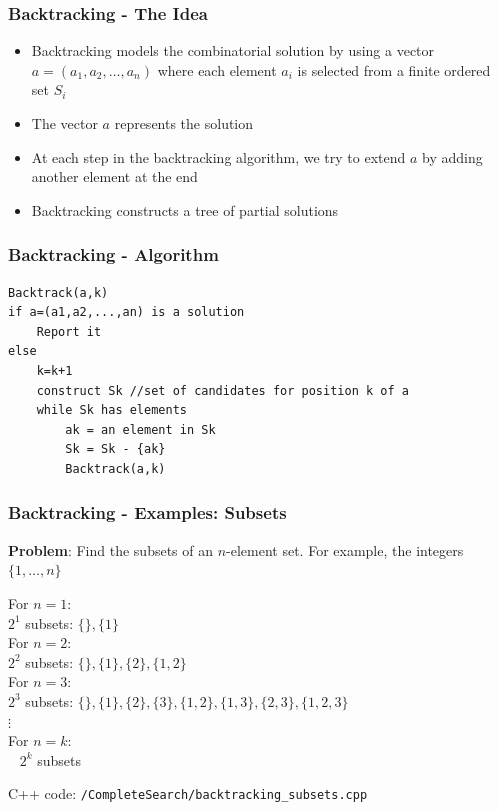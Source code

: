 \documentclass{beamer}
\begin{document}
\begin{frame}[fragile]
\frametitle{Backtracking - The Idea}

\begin{itemize}
    \item Backtracking models the combinatorial solution by using a vector $a = (a_1, a_2, \ldots, a_n)$ where each element $a_i$ is selected from a finite ordered set $S_i$
    \item The vector $a$ represents the solution
    \item At each step in the backtracking algorithm, we try to extend $a$ by adding another element at the end
    \item \color{blue}Backtracking constructs a tree of partial solutions\color{black}
\end{itemize}

\end{frame}

\begin{frame}[fragile]
\frametitle{Backtracking - Algorithm}

\begin{lstlisting}
Backtrack(a,k)
if a=(a1,a2,...,an) is a solution
	Report it
else
	k=k+1
	construct Sk //set of candidates for position k of a
	while Sk has elements
		ak = an element in Sk
		Sk = Sk - {ak}
		Backtrack(a,k)
\end{lstlisting}

\end{frame}

\begin{frame}[fragile]
\frametitle{Backtracking - Examples: Subsets}

\textbf{Problem}: Find the subsets of an $n$-element set. For example, the integers $\{1,\ldots, n\}$ \\ \vspace{0.4cm}

For $n=1$: \\ \hspace{0.5cm} $2^1$ subsets: $\{\}, \{1\}$ \\
For $n=2$: \\ \hspace{0.5cm} $2^2$ subsets: $\{\}, \{1\}, \{2\}, \{1,2\}$ \\
For $n=3$: \\ \hspace{0.5cm} $2^3$ subsets: $\{\}, \{1\}, \{2\}, \{3\}, \{1,2\}, \{1,3\}, \{2,3\}, \{1,2,3\}$ \\

$\vdots$ \\ \vspace{0.2cm}
For $n=k$: \\ \hspace{0.5cm} $2^k$ subsets \\ \vspace{0.3cm}

C++ code: \color{red}\verb|/CompleteSearch/backtracking_subsets.cpp|\color{black}

\end{frame}
\end{document}
